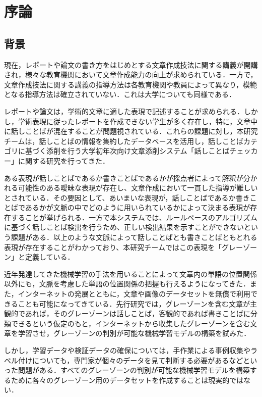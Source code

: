 \chapter{序論\label{c1}}

\section{背景}
現在，レポートや論文の書き方をはじめとする文章作成技法に関する講義が開講され，様々な教育機関において文章作成能力の向上が求められている．一方で，文章作成技法に関する講義の指導方法は各教育機関や教員によって異なり，模範となる指導方法は確立されていない．これは大学についても同様である．

レポートや論文は，学術的文章に適した表現で記述することが求められる．しかし，学術表現に従ったレポートを作成できない学生が多く存在し，特に，文章中に話しことばが混在することが問題視されている．これらの課題に対し，本研究チームは，話しことばの情報を集約したデータベースを活用し，話しことばカテゴリに基づく添削を行う大学初年次向け文章添削システム「話しことばチェッカー」に関する研究を行ってきた．

ある表現が話しことばであるか書きことばであるかが採点者によって解釈が分かれる可能性のある曖昧な表現が存在し、文章作成において一貫した指導が難しいとされている．その要因として、あいまいな表現が，話しことばであるか書きことばであるかが文脈の中でどのように用いられているかによって決まる表現が存在することが挙げられる．一方で本システムでは、ルールベースのアルゴリズムに基づく話しことば検出を行うため、正しい検出結果を示すことができないという課題がある．以上のような文脈によって話しことばとも書きことばともとれる表現が存在することがわかっており、本研究チームではこの表現を「グレーゾーン」と定義している．

近年発達してきた機械学習の手法を用いることによって文章内の単語の位置関係以外にも，文脈を考慮した単語の位置関係の把握も行えるようになってきた．また，インターネットの発展とともに，文章や画像のデータセットを無償で利用できることも可能になってきている．先行研究では，グレーゾーンを含む文章が主観的であれば，そのグレーゾーンは話しことば，客観的であれば書きことばに分類できるという仮定のもと，インターネットから収集したグレーゾーンを含む文章を学習させ，グレーゾーンの判別が可能な機械学習モデルの構築を試みた．

しかし，学習データや検証データの確保については，手作業による事例収集やラベル付けについても，専門家が個々のデータを見て判断する必要があるなどといった問題がある．すべてのグレーゾーンの判別が可能な機械学習モデルを構築するために各々のグレーゾーン用のデータセットを作成することは現実的ではない．

